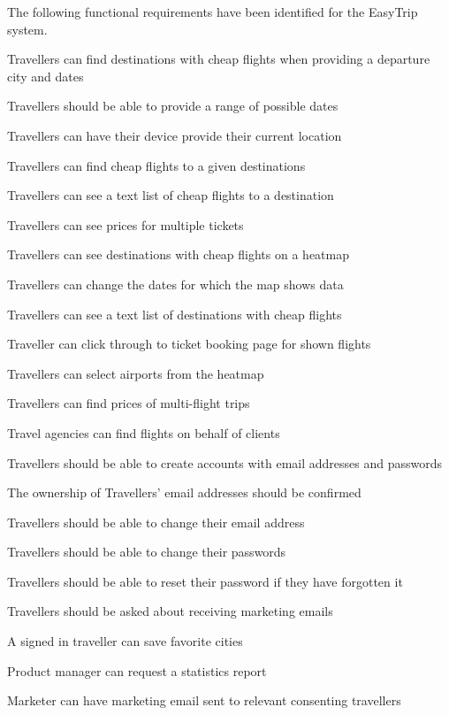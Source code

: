 The following functional requirements have been identified for the EasyTrip system.

Travellers can find destinations with cheap flights when providing a departure city and dates

Travellers should be able to provide a range of possible dates

Travellers can have their device provide their current location

Travellers can find cheap flights to a given destinations

Travellers can see a text list of cheap flights to a destination

Travellers can see prices for multiple tickets

Travellers can see destinations with cheap flights on a heatmap

Travellers can change the dates for which the map shows data

Travellers can see a text list of destinations with cheap flights

Traveller can click through to ticket booking page for shown flights

Travellers can select airports from the heatmap

Travellers can find prices of multi-flight trips

Travel agencies can find flights on behalf of clients

Travellers should be able to create accounts with email addresses and passwords

The ownership of Travellers' email addresses should be confirmed

Travellers should be able to change their email address

Travellers should be able to change their passwords

Travellers should be able to reset their password if they have forgotten it

Travellers should be asked about receiving marketing emails

A signed in traveller can save favorite cities

Product manager can request a statistics report

Marketer can have marketing email sent to relevant consenting travellers

